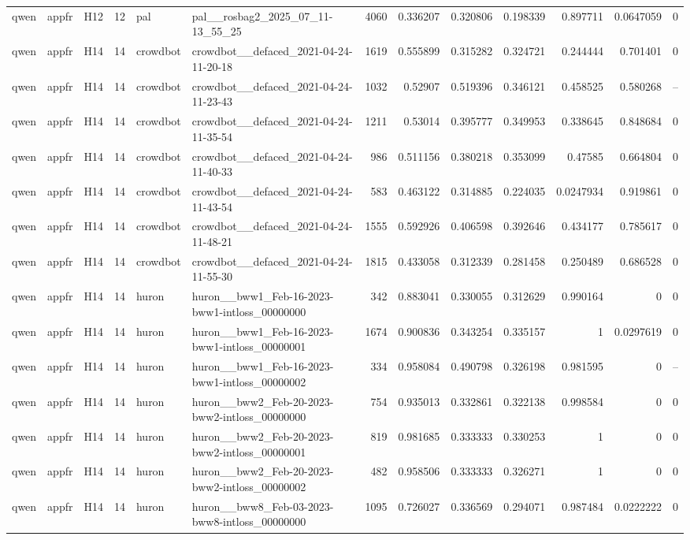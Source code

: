 \begin{longtable}{lllrllrrrrrrr}
qwen & appfr & H12 & 12 & pal & pal\_\_rosbag2\_2025\_07\_11-13\_55\_25 & 4060 & 0.336207 & 0.320806 & 0.198339 & 0.897711 & 0.0647059 & 0 \\
qwen & appfr & H14 & 14 & crowdbot & crowdbot\_\_defaced\_2021-04-24-11-20-18 & 1619 & 0.555899 & 0.315282 & 0.324721 & 0.244444 & 0.701401 & 0 \\
qwen & appfr & H14 & 14 & crowdbot & crowdbot\_\_defaced\_2021-04-24-11-23-43 & 1032 & 0.52907 & 0.519396 & 0.346121 & 0.458525 & 0.580268 & -- \\
qwen & appfr & H14 & 14 & crowdbot & crowdbot\_\_defaced\_2021-04-24-11-35-54 & 1211 & 0.53014 & 0.395777 & 0.349953 & 0.338645 & 0.848684 & 0 \\
qwen & appfr & H14 & 14 & crowdbot & crowdbot\_\_defaced\_2021-04-24-11-40-33 & 986 & 0.511156 & 0.380218 & 0.353099 & 0.47585 & 0.664804 & 0 \\
qwen & appfr & H14 & 14 & crowdbot & crowdbot\_\_defaced\_2021-04-24-11-43-54 & 583 & 0.463122 & 0.314885 & 0.224035 & 0.0247934 & 0.919861 & 0 \\
qwen & appfr & H14 & 14 & crowdbot & crowdbot\_\_defaced\_2021-04-24-11-48-21 & 1555 & 0.592926 & 0.406598 & 0.392646 & 0.434177 & 0.785617 & 0 \\
qwen & appfr & H14 & 14 & crowdbot & crowdbot\_\_defaced\_2021-04-24-11-55-30 & 1815 & 0.433058 & 0.312339 & 0.281458 & 0.250489 & 0.686528 & 0 \\
qwen & appfr & H14 & 14 & huron & huron\_\_bww1\_Feb-16-2023-bww1-intloss\_00000000 & 342 & 0.883041 & 0.330055 & 0.312629 & 0.990164 & 0 & 0 \\
qwen & appfr & H14 & 14 & huron & huron\_\_bww1\_Feb-16-2023-bww1-intloss\_00000001 & 1674 & 0.900836 & 0.343254 & 0.335157 & 1 & 0.0297619 & 0 \\
qwen & appfr & H14 & 14 & huron & huron\_\_bww1\_Feb-16-2023-bww1-intloss\_00000002 & 334 & 0.958084 & 0.490798 & 0.326198 & 0.981595 & 0 & -- \\
qwen & appfr & H14 & 14 & huron & huron\_\_bww2\_Feb-20-2023-bww2-intloss\_00000000 & 754 & 0.935013 & 0.332861 & 0.322138 & 0.998584 & 0 & 0 \\
qwen & appfr & H14 & 14 & huron & huron\_\_bww2\_Feb-20-2023-bww2-intloss\_00000001 & 819 & 0.981685 & 0.333333 & 0.330253 & 1 & 0 & 0 \\
qwen & appfr & H14 & 14 & huron & huron\_\_bww2\_Feb-20-2023-bww2-intloss\_00000002 & 482 & 0.958506 & 0.333333 & 0.326271 & 1 & 0 & 0 \\
qwen & appfr & H14 & 14 & huron & huron\_\_bww8\_Feb-03-2023-bww8-intloss\_00000000 & 1095 & 0.726027 & 0.336569 & 0.294071 & 0.987484 & 0.0222222 & 0 \\

\end{longtable}
